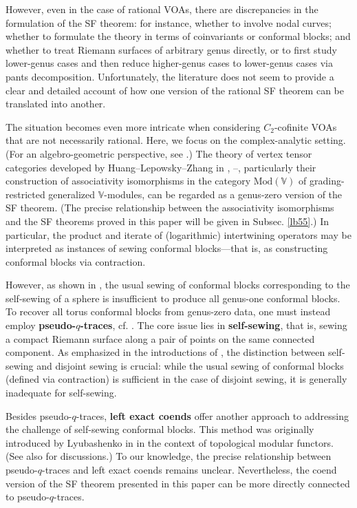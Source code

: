\documentclass[11pt,b5paper,notitlepage]{article}
\theoremstyle{definition}
\theoremstyle{plain}
\newcommand{\Vbb}{\mathbb V}
\newcommand{\<}{\left\langle}
\renewcommand{\>}{\right\rangle}
\newcommand{\Mod}{\mathrm{Mod}}
\numberwithin{equation}{section}
\begin{document}
However, even in the case of rational VOAs, there are discrepancies in the formulation of the SF theorem: for instance, whether to involve nodal curves; whether to formulate the theory in terms of coinvariants or conformal blocks; and whether to treat Riemann surfaces of arbitrary genus directly, or to first study lower-genus cases and then reduce higher-genus cases to lower-genus cases via pants decomposition. Unfortunately, the literature does not seem to provide a clear and detailed account of how one version of the rational SF theorem can be translated into another.

The situation becomes even more intricate when considering $C_2$-cofinite VOAs that are not necessarily rational. Here, we focus on the complex-analytic setting. (For an algebro-geometric perspective, see \cite{DGK-presentations, DGK2}.) The theory of vertex tensor categories developed by Huang–Lepowsky–Zhang in \cite{HLZ1}, \cite{HLZ2}–\cite{HLZ8}, particularly their construction of associativity isomorphisms in the category $\Mod(\Vbb)$ of grading-restricted generalized $\Vbb$-modules, can be regarded as a genus-zero version of the SF theorem. (The precise relationship between the associativity isomorphisms and the SF theorems proved in this paper will be given in Subsec. \ref{lb55}.) In particular, the product and iterate of (logarithmic) intertwining operators may be interpreted as instances of sewing conformal blocks—that is, as constructing conformal blocks via contraction.


However, as shown in \cite{Miy-modular-invariance}, the usual sewing of conformal blocks corresponding to the self-sewing of a sphere is insufficient to produce all genus-one conformal blocks. To recover all torus conformal blocks from genus-zero data, one must instead employ \textbf{pseudo-$q$-traces}, cf. \cite{Miy-modular-invariance,AN-pseudo-trace,Hua-modular-C2}. The core issue lies in \textbf{self-sewing}, that is, sewing a compact Riemann surface along a pair of points on the same connected component. As emphasized in the introductions of \cite{GZ1, GZ2}, the distinction between self-sewing and disjoint sewing is crucial: while the usual sewing of conformal blocks (defined via contraction) is sufficient in the case of disjoint sewing, it is generally inadequate for self-sewing. 

Besides pseudo-$q$-traces, \textbf{left exact coends} offer another approach to addressing the challenge of self-sewing conformal blocks. This method was originally introduced by Lyubashenko in \cite{Lyu96-Ribbon} in the context of topological modular functors. (See also \cite{FS-coends-CFT, HR24-MF} for discussions.) To our knowledge, the precise relationship between pseudo-$q$-traces and left exact coends remains unclear. Nevertheless, the coend version of the SF theorem presented in this paper can be more directly connected to pseudo-$q$-traces. 
\end{document}
